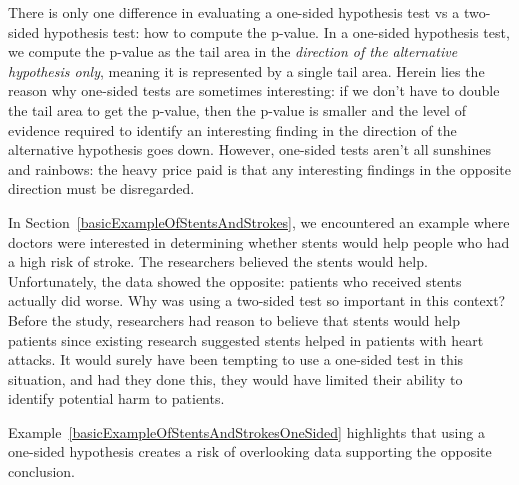 There is only one difference in evaluating a one-sided
hypothesis test vs a two-sided hypothesis test: how to
compute the p-value.
In a one-sided hypothesis test, we compute the p-value as
the tail area in the \emph{direction of the alternative
hypothesis only}, meaning it is represented by a single
tail area. Herein lies the reason why one-sided tests
are sometimes interesting: if we don't have to double
the tail area to get the p-value, then the p-value is
smaller and the level of evidence required to identify
an interesting finding in the direction of the
alternative hypothesis goes down.
However, one-sided tests aren't all sunshines and rainbows:
the heavy price paid is that any interesting findings
in the opposite direction must be disregarded.

\begin{example}{
    In Section~\ref{basicExampleOfStentsAndStrokes},
    we encountered an example where doctors were interested
    in determining whether stents would help people who had
    a high risk of stroke.
    The researchers believed the stents would help.
    Unfortunately, the data showed the opposite:
    patients who received stents actually did worse.
    Why was using a two-sided test so important in
    this context?}
    \label{basicExampleOfStentsAndStrokesOneSided}
  Before the study, researchers had reason to believe
  that stents would help patients since existing research
  suggested stents helped in patients with heart attacks.
  It would surely have been tempting to use a one-sided
  test in this situation, and had they done this,
  they would have limited their ability to identify
  potential harm to patients.
\end{example}

Example~\ref{basicExampleOfStentsAndStrokesOneSided}
highlights that using a one-sided hypothesis creates
a risk of overlooking data supporting the opposite
conclusion.


